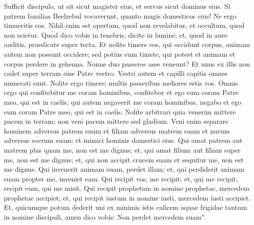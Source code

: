 \begin{biblechapter}
\verse Sufficit discipulo, ut sit sicut magister eius, et servus sicut dominus eius. Si patrem familias Beelzebul vocaverunt, quanto magis domesticos eius! 
\verse Ne ergo timueritis eos. Nihil enim est opertum, quod non revelabitur, et occultum, quod non scietur. 
\verse Quod dico vobis in tenebris, dicite in lumine; et, quod in aure auditis, praedicate super tecta. 
\verse Et nolite timere eos, qui occidunt corpus, animam autem non possunt occidere; sed potius eum timete, qui potest et animam et corpus perdere in gehenna. 
\verse Nonne duo passeres asse veneunt? Et unus ex illis non cadet super terram sine Patre vestro. 
\verse Vestri autem et capilli capitis omnes numerati sunt. 
\verse Nolite ergo timere; multis passeribus meliores estis vos. 
\verse Omnis ergo qui confitebitur me coram hominibus, confitebor et ego eum coram Patre meo, qui est in caelis; 
\verse qui autem negaverit me coram hominibus, negabo et ego eum coram Patre meo, qui est in caelis. 
\verse Nolite arbitrari quia venerim mittere pacem in terram; non veni pacem mittere sed gladium. 
\verse Veni enim separare hominem adversus patrem suum et filiam adversus matrem suam et nurum adversus socrum suam: 
\verse et inimici hominis domestici eius. 
\verse Qui amat patrem aut matrem plus quam me, non est me dignus; et, qui amat filium aut filiam super me, non est me dignus; 
\verse et, qui non accipit crucem suam et sequitur me, non est me dignus. 
\verse Qui invenerit animam suam, perdet illam; et, qui perdiderit animam suam propter me, inveniet eam. 
\verse Qui recipit vos, me recipit; et, qui me recipit, recipit eum, qui me misit. 
\verse Qui recipit prophetam in nomine prophetae, mercedem prophetae accipiet; et, qui recipit iustum in nomine iusti, mercedem iusti accipiet. 
\verse Et, quicumque potum dederit uni ex minimis istis calicem aquae frigidae tantum in nomine discipuli, amen dico vobis: Non perdet mercedem suam". 
\end{biblechapter}

